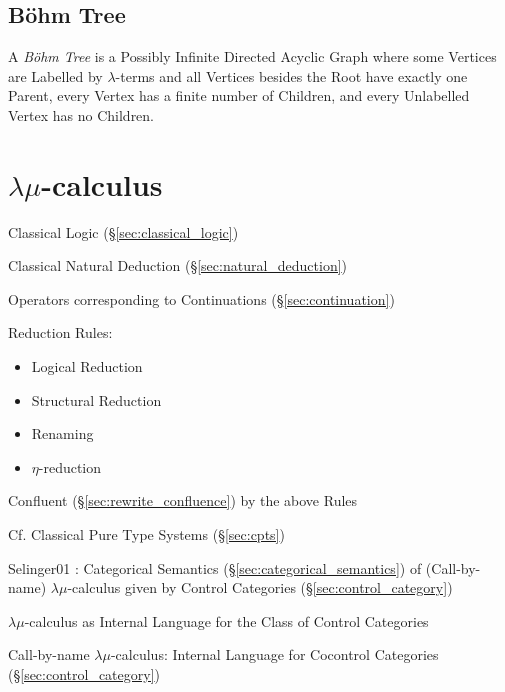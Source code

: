 \endgroup



\subsection{B\"ohm Tree}\label{sec:bohm_tree}

A \emph{B\"ohm Tree} is a Possibly Infinite Directed Acyclic Graph
where some Vertices are Labelled by $\lambda$-terms and all Vertices
besides the Root have exactly one Parent, every Vertex has a finite
number of Children, and every Unlabelled Vertex has no Children.



\section{$\lambda\mu$-calculus}\label{sec:lambda_mu}

Classical Logic (\S\ref{sec:classical_logic})

Classical Natural Deduction (\S\ref{sec:natural_deduction})

Operators corresponding to Continuations (\S\ref{sec:continuation})

Reduction Rules:
\begin{itemize}
  \item Logical Reduction
  \item Structural Reduction
  \item Renaming
  \item $\eta$-reduction
\end{itemize}

Confluent (\S\ref{sec:rewrite_confluence}) by the above Rules

\fist Cf. Classical Pure Type Systems (\S\ref{sec:cpts})


Selinger01 \cite{selinger01}: Categorical Semantics
(\S\ref{sec:categorical_semantics}) of (Call-by-name)
$\lambda\mu$-calculus given by Control Categories
(\S\ref{sec:control_category})

$\lambda\mu$-calculus as Internal Language for the Class of Control
Categories

Call-by-name $\lambda\mu$-calculus: Internal Language for Cocontrol
Categories (\S\ref{sec:control_category})

